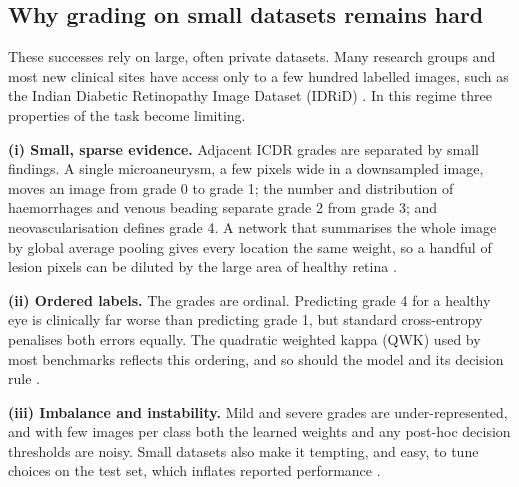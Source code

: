 \subsection*{Why grading on small datasets remains hard}
These successes rely on large, often private datasets. Many research groups and most new clinical sites have access
only to a few hundred labelled images, such as the Indian Diabetic Retinopathy Image Dataset (IDRiD)
\citep{porwal2018idrid,porwal2020idrid}. In this regime three properties of the task become limiting.

\textbf{(i) Small, sparse evidence.} Adjacent ICDR grades are separated by small findings. A single microaneurysm,
a few pixels wide in a downsampled image, moves an image from grade 0 to grade 1; the number and distribution of
haemorrhages and venous beading separate grade 2 from grade 3; and neovascularisation defines grade 4. A network that
summarises the whole image by global average pooling gives every location the same weight, so a handful of
lesion pixels can be diluted by the large area of healthy retina \citep{wang2017zoom,sun2021lesion}.

\textbf{(ii) Ordered labels.} The grades are ordinal. Predicting grade 4 for a healthy eye is clinically far worse
than predicting grade 1, but standard cross-entropy penalises both errors equally. The quadratic weighted kappa
(QWK) used by most benchmarks \citep{cohen1968weighted} reflects this ordering, and so should the model and its
decision rule \citep{niu2016ordinal,cao2020rank,delatorre2018weighted}.

\textbf{(iii) Imbalance and instability.} Mild and severe grades are under-represented, and with few images per class
both the learned weights and any post-hoc decision thresholds are noisy. Small datasets also make it tempting,
and easy, to tune choices on the test set, which inflates reported performance
\citep{varma2006bias,kapoor2023leakage}.

